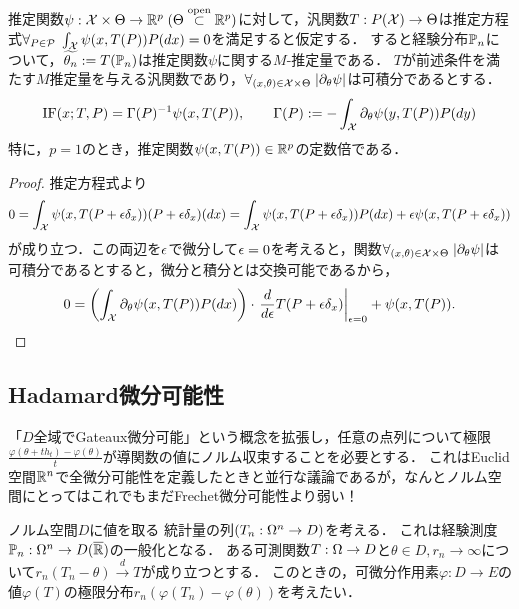 \documentclass[uplatex,dvipdfmx]{jsreport}
\begin{document}
\begin{example}[$M$-推定量の影響関数]
    推定関数$\psi:\mathcal{X}\times\Theta\to\mathbb{R}^p\;(\Theta\overset{\mathrm{open}}{\subset}\mathbb{R}^p)$に対して，汎関数$T:P(\mathcal{X})\to\Theta$は推定方程式$\forall_{P\in\mathcal{P}}\;\int_{\mathcal{X}}\psi(x,T(P))P(dx)=0$を満足すると仮定する．
    すると経験分布$\mathbb{P}_n$について，$\widetilde{\theta_n}:=T(\mathbb{P}_n)$は推定関数$\psi$に関する$M$-推定量である．
    $T$が前述条件を満たす$M$推定量を与える汎関数であり，$\forall_{(x,\theta)\in\mathcal{X}\times\Theta}\;\lvert\partial_\theta\psi\rvert$は可積分であるとする．
    \[\mathrm{IF}(x;T,P)=\Gamma(P)^{-1}\psi(x,T(P)),\qquad\Gamma(P):=-\int_{\mathcal{X}}\partial_\theta\psi(y,T(P))P(dy)\]
    特に，$p=1$のとき，推定関数$\psi(x,T(P))\in\mathbb{R}^p$の定数倍である．
\end{example}
\begin{proof}
    推定方程式より
    \[0=\int_{\mathcal{X}}\psi(x,T(P+\epsilon\delta_x))(P+\epsilon\delta_x)(dx)=\int_{\mathcal{X}}\psi(x,T(P+\epsilon\delta_x))P(dx)+\epsilon\psi(x,T(P+\epsilon\delta_x))\]
    が成り立つ．この両辺を$\epsilon$で微分して$\epsilon=0$を考えると，関数$\forall_{(x,\theta)\in\mathcal{X}\times\Theta}\;\lvert\partial_\theta\psi\rvert$は可積分であるとすると，微分と積分とは交換可能であるから，
    \[0=\left(\int_{\mathcal{X}}\partial_\theta\psi(x,T(P))P(dx)\right)\cdot\left.\frac{d }{d \epsilon}T(P+\epsilon\delta_x)\right|_{\epsilon=0}+\psi(x,T(P)).\]
\end{proof}

\subsection{Hadamard微分可能性}

\begin{tcolorbox}[colframe=ForestGreen, colback=ForestGreen!10!white,breakable,colbacktitle=ForestGreen!40!white,coltitle=black,fonttitle=\bfseries\sffamily,
title=]
    「$D$全域でGateaux微分可能」という概念を拡張し，任意の点列について極限$\frac{\varphi(\theta+th_t)-\varphi(\theta)}{t}$が導関数の値にノルム収束することを必要とする．
    これはEuclid空間$\mathbb{R}^n$で全微分可能性を定義したときと並行な議論であるが，なんとノルム空間にとってはこれでもまだFrechet微分可能性より弱い！
\end{tcolorbox}

\begin{notation}
    ノルム空間$D$に値を取る
    統計量の列$(T_n:\Omega^n\to D)$を考える．
    これは経験測度$\mathbb{P}_n:\Omega^n\to D(\overline{\mathbb{R}})$の一般化となる．
    ある可測関数$T:\Omega\to D$と$\theta\in D,r_n\to\infty$について$r_n(T_n-\theta)\xrightarrow{d}T$が成り立つとする．
    このときの，可微分作用素$\varphi:D\to E$の値$\varphi(T)$の極限分布$r_n(\varphi(T_n)-\varphi(\theta))$を考えたい．
\end{notation}
\end{document}
